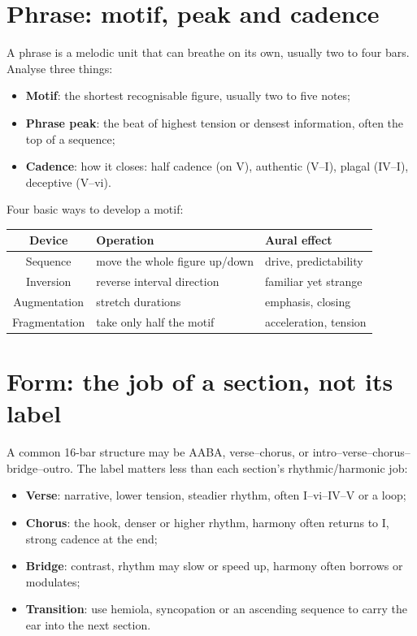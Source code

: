 \section{Phrase: motif, peak and cadence}

A phrase is a melodic unit that can breathe on its own, usually two to four bars. Analyse three things:

\begin{itemize}
  \item \textbf{Motif}: the shortest recognisable figure, usually two to five notes;
  \item \textbf{Phrase peak}: the beat of highest tension or densest information, often the top of a sequence;
  \item \textbf{Cadence}: how it closes: half cadence (on V), authentic (V--I), plagal (IV--I), deceptive (V--vi).
\end{itemize}

Four basic ways to develop a motif:

\begin{center}
\small
\begin{tabular}{cll}
\toprule
Device & Operation & Aural effect \\
\midrule
Sequence & move the whole figure up/down & drive, predictability \\
Inversion & reverse interval direction & familiar yet strange \\
Augmentation & stretch durations & emphasis, closing \\
Fragmentation & take only half the motif & acceleration, tension \\
\bottomrule
\end{tabular}
\end{center}

\section{Form: the job of a section, not its label}

A common 16-bar structure may be AABA, verse--chorus, or intro--verse--chorus--bridge--outro. The label matters less than each section's rhythmic/harmonic job:

\begin{itemize}
  \item \textbf{Verse}: narrative, lower tension, steadier rhythm, often I--vi--IV--V or a loop;
  \item \textbf{Chorus}: the hook, denser or higher rhythm, harmony often returns to I, strong cadence at the end;
  \item \textbf{Bridge}: contrast, rhythm may slow or speed up, harmony often borrows or modulates;
  \item \textbf{Transition}: use hemiola, syncopation or an ascending sequence to carry the ear into the next section.
\end{itemize}

